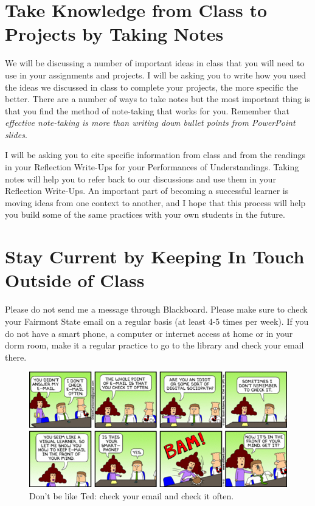 \documentclass{tufte-handout}
\begin{document}
\section{Take Knowledge from Class to Projects by Taking Notes}
We will be discussing a number of important ideas in class that you will need to use in your assignments and projects. I will be asking you to write how you used the ideas we discussed in class to complete your projects, the more specific the better. There are a number of ways to take notes but the most important thing is that you find the method of note-taking that works for you. Remember that \emph{effective note-taking is more than writing down bullet points from PowerPoint slides}.

 I will be asking you to cite specific information from class and from the readings in your \textsf{Reflection Write-Ups} for your \textsf{Performances of Understandings}. Taking notes will help you to refer back to our discussions and use them in your \textsf{Reflection Write-Ups}. An important part of becoming a successful learner is moving ideas from one context to another, and I hope that this process will help you build some of the same practices with your own students in the future.

\section{Stay Current by Keeping In Touch Outside of Class}

 Please do not send me a message through Blackboard. Please make sure to check your Fairmont State email on a regular basis (at least 4-5 times per week). If you do not have a smart phone, a computer or internet access at home or in your dorm room, make it a regular practice to go to the library and check your email there.

\begin{figure}%
  \includegraphics[width=\linewidth]{dilbert-email.png}
  \caption{Don't be like Ted: check your email and check it often.}
  \label{fig:dilbert-email}
\end{figure}
\end{document}
